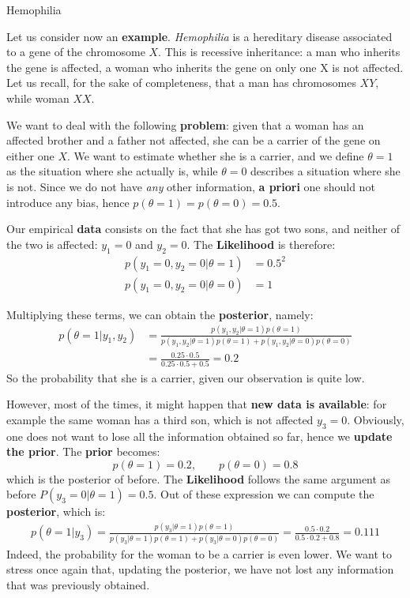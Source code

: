\documentclass[../main/main.tex]{subfiles}
\begin{document}
\begin{example}{Hemophilia}{}

Let us consider now an \textbf{example}. \textit{Hemophilia} is a hereditary disease associated to a gene of the chromosome $X$. This is recessive inheritance: a man who inherits the gene is affected, a woman who inherits the gene on only one X is not affected. Let us recall, for the sake of completeness, that a man has chromosomes $XY$, while woman $XX$.

We want to deal with the following \textbf{problem}: given that a woman has an affected brother and a father not affected, she can be a carrier of the gene on either one $X$. We want to estimate whether she is a carrier, and we define $\theta = 1$ as the situation where she actually is, while $\theta = 0$ describes a situation where she is not. Since we do not have \textit{any} other information, \textbf{a priori} one should not introduce any bias, hence $p(\theta = 1 ) = p(\theta = 0) = 0.5$.

Our empirical \textbf{data} consists on the fact that she has got two sons, and neither of the two is affected: $y_1 = 0$ and $y_2=0$. The \textbf{Likelihood} is therefore:
\begin{align*}
    p(y_1 = 0, y_2 = 0 | \theta = 1 )&= 0.5^2\\
    p(y_1 = 0, y_2 = 0 | \theta = 0 )&= 1
\end{align*}

Multiplying these terms, we can obtain the \textbf{posterior}, namely:
\begin{equation*}
\begin{split}
    p(\theta = 1 | y_1, y_2) &= \frac{p( y_1, y_2 | \theta = 1)p(\theta = 1)}{p( y_1, y_2 | \theta = 1)p(\theta = 1)+ p( y_1, y_2 | \theta = 0)p(\theta = 0)} \\ &= \frac{0.25 \cdot 0.5}{0.25 \cdot 0.5 + 0.5} = 0.2
\end{split}
\end{equation*}
So the probability that she is a carrier, given our observation is quite low.

However, most of the times, it might happen that \textbf{new data is available}: for example the same woman has a third son, which is not affected $y_3 = 0$. Obviously, one does not want to lose all the information obtained so far, hence we \textbf{update the prior}. The \textbf{prior} becomes:
\begin{equation*}
    p(\theta = 1 ) = 0.2, \qquad p(\theta = 0) = 0.8
\end{equation*}
which is the posterior of before.
The \textbf{Likelihood} follows the same argument as before $P(y_3 = 0 | \theta = 1 ) = 0.5$. Out of these expression we can compute the \textbf{posterior}, which is:
\begin{align*}
        p(\theta = 1 | y_3) = \frac{p(  y_3 | \theta = 1)p(\theta = 1)}{p(  y_3 | \theta = 1)p(\theta = 1)+ p(  y_3 | \theta = 0)p(\theta = 0)} = \frac{0.5 \cdot 0.2}{0.5 \cdot 0.2 + 0.8} = 0.111
\end{align*}
Indeed, the probability for the woman to be a carrier is even lower. We want to stress once again that, updating the posterior, we have not lost any information that was previously obtained.


\end{example}
\end{document}

